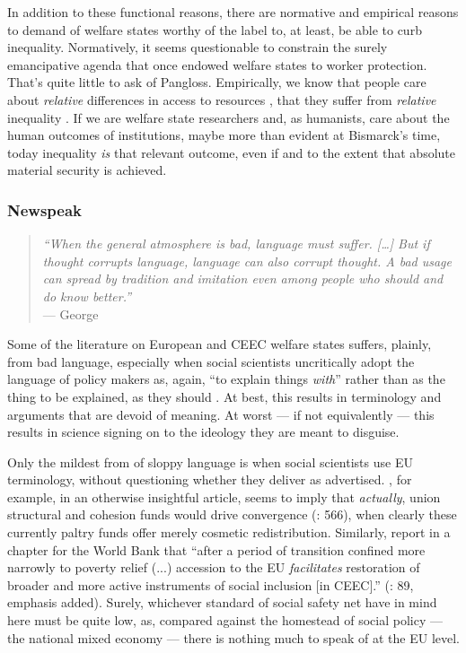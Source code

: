 \documentclass[11pt,a4paper,oneside,openright]{article}
\begin{document}
\begin{enumerate}
	In addition to these functional reasons, there are normative and empirical reasons to demand of welfare states worthy of the label to, at least, be able to curb inequality. 
	Normatively, it seems questionable to constrain the surely emancipative agenda that once endowed welfare states to worker protection. 
	That's quite little to ask of Pangloss. 
	Empirically, we know that people care about \emph{relative} differences in access to resources \citep{Frank2005}, that they suffer from \emph{relative} inequality \citep{Pickett-2009-kx}. 
	If we are welfare state researchers and, as humanists, care about the human outcomes of institutions, maybe more than evident at Bismarck's time, today inequality \emph{is} that relevant outcome, even if and to the extent that absolute material security is achieved.
\end{enumerate}

\subsubsection[Newspeak]{Newspeak} \label{sec:newspeak}

\begin{quote}
	\emph{``When the general atmosphere is bad, language must suffer. 
	[\ldots] But if thought corrupts language, language can also corrupt thought. 
	A bad usage can spread by tradition and imitation even among people who should and do know better.''}\\
	--- George \citealt{Orwell1946}
\end{quote}

Some of the literature on European and \gls{CEEC} welfare states suffers, plainly, from bad language, especially when social scientists uncritically adopt the language of policy makers as, again, ``to explain things \emph{with}'' rather than as the thing to be explained, as they should \citep{Brubaker-2002-aa}. 
At best, this results in terminology and arguments that are devoid of meaning. 
At worst --- if not equivalently --- this results in science signing on to the ideology they are meant to disguise.

Only the mildest from of sloppy language is when social scientists use \gls{EU} terminology, without questioning whether they deliver as advertised. 
\citeauthor{Dehey2003}, for example, in an otherwise insightful article, seems to imply that \emph{actually}, union structural and cohesion funds would drive convergence (\citeyear{Dehey2003}: 566), when clearly these currently paltry funds offer merely cosmetic redistribution. 
Similarly, \citeauthor{Sipos2005} report in a chapter for the World Bank that ``after a period of transition confined more narrowly to poverty relief (...) accession to the \gls{EU} \emph{facilitates} restoration of broader and more active instruments of social inclusion [in \gls{CEEC}].'' (\citeyear{Sipos2005}: 89, emphasis added). 
Surely, whichever standard \citeauthor{Sipos2005} of social safety net have in mind here must be quite low, as, compared against the homestead of social policy --- the national mixed economy --- there is nothing much to speak of at the \gls{EU} level.
\end{document}
